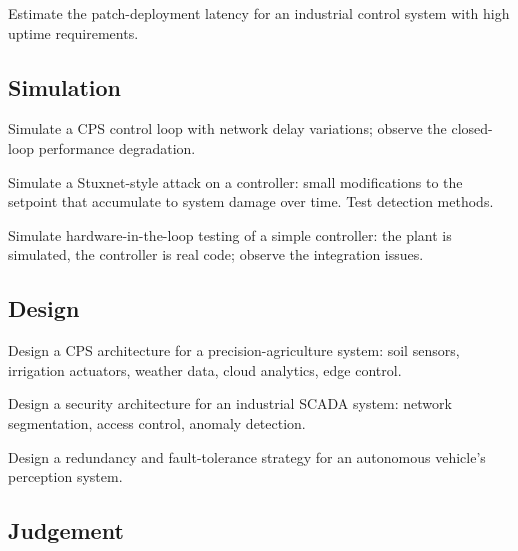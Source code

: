 \begin{exercise}
Estimate the patch-deployment latency for an industrial control system with high uptime requirements.
\end{exercise}

\subsection*{Simulation}

\begin{exercise}
Simulate a CPS control loop with network delay variations; observe the closed-loop performance degradation.
\end{exercise}

\begin{exercise}
Simulate a Stuxnet-style attack on a controller: small modifications to the setpoint that accumulate to system damage over time. Test detection methods.
\end{exercise}

\begin{exercise}
Simulate hardware-in-the-loop testing of a simple controller: the plant is simulated, the controller is real code; observe the integration issues.
\end{exercise}

\subsection*{Design}

\begin{exercise}
Design a CPS architecture for a precision-agriculture system: soil sensors, irrigation actuators, weather data, cloud analytics, edge control.
\end{exercise}

\begin{exercise}
Design a security architecture for an industrial SCADA system: network segmentation, access control, anomaly detection.
\end{exercise}

\begin{exercise}
Design a redundancy and fault-tolerance strategy for an autonomous vehicle's perception system.
\end{exercise}

\subsection*{Judgement}

